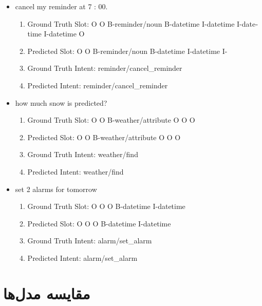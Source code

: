 \documentclass[12pt, a4paper]{book}
\begin{document}
\begin{latin}
    \begin{itemize}
        \item cancel my reminder at 7 : 00.
        \begin{enumerate}
            \item Ground Truth Slot: O O B-reminder/noun B-datetime I-datetime I-datetime I-datetime O
            \item Predicted Slot: O O B-reminder/noun B-datetime I-datetime I-
            \item Ground Truth Intent: reminder/cancel\_reminder
            \item Predicted Intent: reminder/cancel\_reminder
        \end{enumerate}
        \item how much snow is predicted?
        \begin{enumerate}
            \item Ground Truth Slot: O O B-weather/attribute O O O
            \item Predicted Slot: O O B-weather/attribute O O O
            \item Ground Truth Intent: weather/find
            \item Predicted Intent: weather/find
        \end{enumerate}
        \item set 2 alarms for tomorrow
        \begin{enumerate}
            \item Ground Truth Slot: O O O B-datetime I-datetime
            \item Predicted Slot: O O O B-datetime I-datetime
            \item Ground Truth Intent: alarm/set\_alarm
            \item Predicted Intent: alarm/set\_alarm
        \end{enumerate}
    \end{itemize}
\end{latin}

\section*{مقایسه‌ مدل‌ها}
\end{document}
